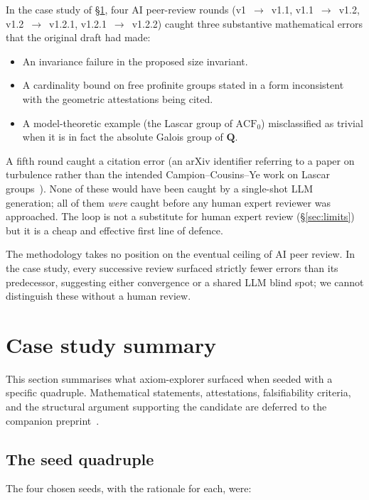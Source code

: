 \documentclass[11pt]{article}
\theoremstyle{definition}
\theoremstyle{remark}
\begin{document}
In the case study of \S\ref{sec:case}, four AI peer-review rounds
(v1~$\to$~v1.1, v1.1~$\to$~v1.2, v1.2~$\to$~v1.2.1, v1.2.1~$\to$~v1.2.2)
caught three substantive mathematical errors that the original draft had
made:

\begin{itemize}
\item An invariance failure in the proposed size invariant.
\item A cardinality bound on free profinite groups stated in a form
inconsistent with the geometric attestations being cited.
\item A model-theoretic example (the Lascar group of $\mathrm{ACF}_0$)
misclassified as trivial when it is in fact the absolute Galois group
of $\mathbf{Q}$.
\end{itemize}

A fifth round caught a citation error (an arXiv identifier referring to
a paper on turbulence rather than the intended Campion--Cousins--Ye work
on Lascar groups~\cite{CampionCousinsYe2021}). None of these would have
been caught by a single-shot LLM generation; all of them \emph{were}
caught before any human expert reviewer was approached. The loop is not
a substitute for human expert review (\S\ref{sec:limits}) but it is a
cheap and effective first line of defence.

The methodology takes no position on the eventual ceiling of AI peer
review. In the case study, every successive review surfaced strictly
fewer errors than its predecessor, suggesting either convergence or a
shared LLM blind spot; we cannot distinguish these without a human
review.

\section{Case study summary}\label{sec:case}

This section summarises what axiom-explorer surfaced when seeded with a
specific quadruple. Mathematical statements, attestations, falsifiability
criteria, and the structural argument supporting the candidate are
deferred to the companion preprint~\cite{Vera2026Conjecture}.

\subsection{The seed quadruple}

The four chosen seeds, with the rationale for each, were:
\end{document}
